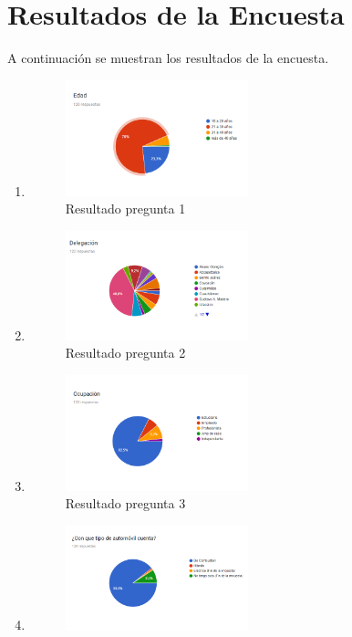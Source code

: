 \section{Resultados de la Encuesta}
A continuación se muestran los resultados de la encuesta.
\begin{enumerate}
	\item \begin{figure}[H]
		\centering
		\includegraphics[width=0.5\textwidth]{Apendice2/img/Edad}
		\caption{Resultado pregunta 1}
	\end{figure}
\item \begin{figure}[H]
	\centering
	\includegraphics[width=0.5\textwidth]{Apendice2/img/Delegacion}
	\caption{Resultado pregunta 2}
\end{figure}
	\item \begin{figure}[H]
		\centering
		\includegraphics[width=0.5\textwidth]{Apendice2/img/Ocupacion}
		\caption{Resultado pregunta 3}
	\end{figure}
\item \begin{figure}[H]
	\centering
	\includegraphics[width=0.5\textwidth]{Apendice2/img/TipoAutomovil}

\end{figure}
\end{enumerate}
